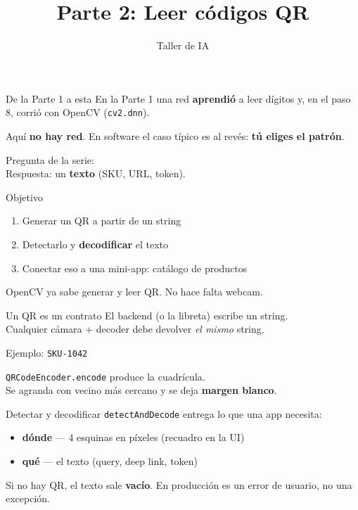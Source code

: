 \documentclass[aspectratio=169]{beamer}
\title{Parte 2: Leer códigos QR}
\subtitle{\libreta{02\_taller\_qr.ipynb}}
\author{Taller de IA}
\begin{document}
\begin{frame}
  \titlepage
\end{frame}

\begin{frame}{De la Parte 1 a esta}
  En la Parte 1 una red \textbf{aprendió} a leer dígitos y, en el paso 8, corrió con OpenCV (\texttt{cv2.dnn}).

  Aquí \textbf{no hay red}. En software el caso típico es al revés: \textbf{tú eliges el patrón}.

  Pregunta de la serie: \pregunta\\
  Respuesta: un \textbf{texto} (SKU, URL, token).
\end{frame}

\begin{frame}{Objetivo}
  \begin{enumerate}
    \item Generar un QR a partir de un string
    \item Detectarlo y \textbf{decodificar} el texto
    \item Conectar eso a una mini-app: catálogo de productos
  \end{enumerate}

  OpenCV ya sabe generar y leer QR. No hace falta webcam.
\end{frame}

\begin{frame}{Un QR es un contrato}
  El backend (o la libreta) escribe un string.\\
  Cualquier cámara + decoder debe devolver \emph{el mismo} string.

  Ejemplo: \texttt{SKU-1042}

  \texttt{QRCodeEncoder.encode} produce la cuadrícula.\\
  Se agranda con vecino más cercano y se deja \textbf{margen blanco}.
\end{frame}

\begin{frame}{Detectar y decodificar}
  \texttt{detectAndDecode} entrega lo que una app necesita:

  \begin{itemize}
    \item \textbf{dónde} --- 4 esquinas en píxeles (recuadro en la UI)
    \item \textbf{qué} --- el texto (query, deep link, token)
  \end{itemize}

  Si no hay QR, el texto sale \textbf{vacío}. En producción es un error de usuario, no una excepción.
\end{frame}
\end{document}
